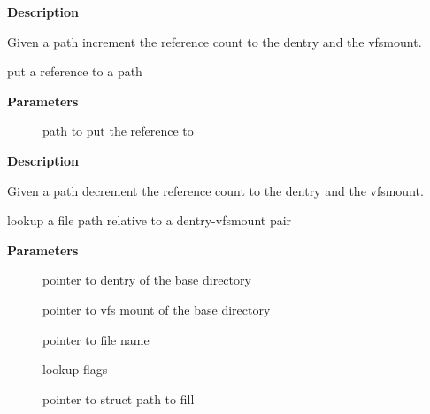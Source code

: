 \documentclass[a4paper,8pt,english]{sphinxmanual}
\begin{document}
\textbf{Description}

Given a path increment the reference count to the dentry and the vfsmount.

\begin{fulllineitems}
\label{filesystems/index:c.path_put}
put a reference to a path

\end{fulllineitems}


\textbf{Parameters}
\begin{description}
\item[{}] \leavevmode
path to put the reference to

\end{description}

\textbf{Description}

Given a path decrement the reference count to the dentry and the vfsmount.

\begin{fulllineitems}
\label{filesystems/index:c.vfs_path_lookup}
lookup a file path relative to a dentry-vfsmount pair

\end{fulllineitems}


\textbf{Parameters}
\begin{description}
\item[{}] \leavevmode
pointer to dentry of the base directory

\item[{}] \leavevmode
pointer to vfs mount of the base directory

\item[{}] \leavevmode
pointer to file name

\item[{}] \leavevmode
lookup flags

\item[{}] \leavevmode
pointer to struct path to fill

\end{description}
\end{document}
